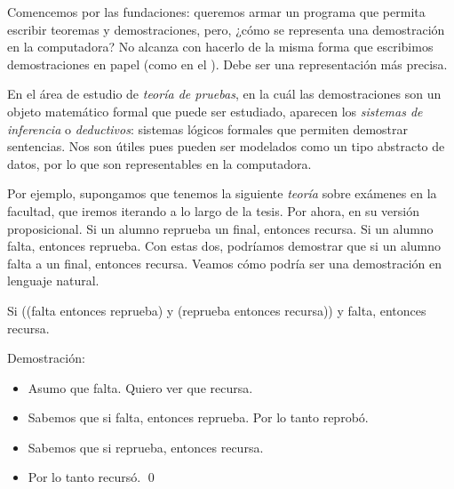 
Comencemos por las fundaciones: queremos armar un programa que permita escribir
teoremas y demostraciones, pero, ¿cómo se representa una demostración en la
computadora? No alcanza con hacerlo de la misma forma que escribimos demostraciones en papel (como en el ). Debe ser una representación más precisa.

En el área de estudio de \textit{teoría de pruebas}, en la cuál las
demostraciones son un objeto matemático formal que puede ser estudiado, aparecen
los \textit{sistemas de inferencia} o \textit{deductivos}: sistemas lógicos formales que
permiten demostrar sentencias. Nos son útiles pues pueden ser modelados como un
tipo abstracto de datos, por lo que son representables en la computadora.

Por ejemplo, supongamos que tenemos la siguiente \textit{teoría} sobre exámenes
en la facultad, que iremos iterando a lo largo de la tesis. Por ahora, en su
versión proposicional. Si un alumno reprueba un final, entonces recursa. Si un
alumno falta, entonces reprueba. Con estas dos, podríamos demostrar que si un
alumno falta a un final, entonces recursa. Veamos cómo podría ser una
demostración en lenguaje natural.

\begin{ejemplo}\label{nd:ex:exam}
    Si ((falta entonces reprueba) y (reprueba entonces recursa)) y falta, entonces recursa.

    Demostración:
\begin{itemize}
    \item Asumo que falta. Quiero ver que recursa.
    \item Sabemos que si falta, entonces reprueba. Por lo tanto reprobó.
    \item Sabemos que si reprueba, entonces recursa.
    \item Por lo tanto recursó. \qed
\end{itemize}
\end{ejemplo}

